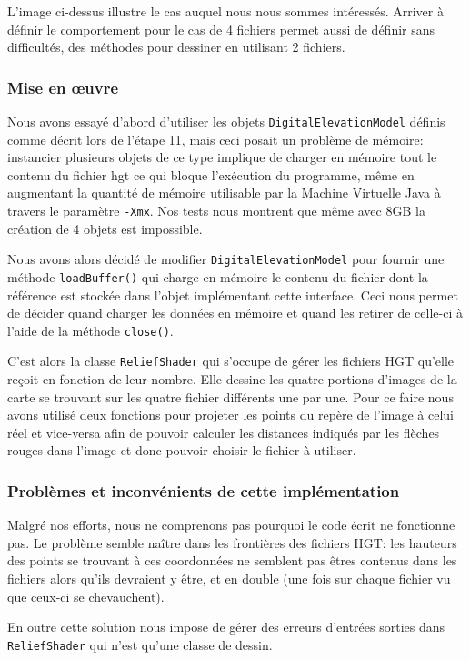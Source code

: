 \documentclass[11pt,a4paper]{article}
\begin{document}
L'image ci-dessus illustre le cas auquel nous nous sommes intéressés. Arriver à définir le comportement pour le cas de 4 fichiers permet aussi de définir sans difficultés, des méthodes pour dessiner en utilisant 2 fichiers.

\subsubsection*{Mise en œuvre}
Nous avons essayé d'abord d'utiliser les objets \texttt{DigitalElevationModel} définis comme décrit lors de l'étape 11, mais ceci posait un problème de mémoire: instancier plusieurs objets de ce type implique de charger en mémoire tout le contenu du fichier hgt ce qui bloque l'exécution du programme, même en augmentant la quantité de mémoire utilisable par la Machine Virtuelle Java à travers le paramètre \texttt{-Xmx}. Nos tests nous montrent que même avec 8GB la création de 4 objets est impossible.

Nous avons alors décidé de modifier \texttt{DigitalElevationModel} pour fournir une méthode \texttt{loadBuffer()} qui charge en mémoire le contenu du fichier dont la référence est stockée dans l'objet implémentant cette interface. Ceci nous permet de décider quand charger les données en mémoire et quand les retirer de celle-ci à l'aide de la méthode \texttt{close()}.

C'est alors la classe \texttt{ReliefShader} qui s'occupe de gérer les fichiers HGT qu'elle reçoit en fonction de leur nombre. Elle dessine les quatre portions d'images de la carte se trouvant sur les quatre fichier différents une par une. Pour ce faire nous avons utilisé deux fonctions pour projeter les points du repère de l'image à celui réel et vice-versa afin de pouvoir calculer les distances indiqués par les flèches rouges dans l'image et donc pouvoir choisir le fichier à utiliser.

\subsubsection*{Problèmes et inconvénients de cette implémentation}
Malgré nos efforts, nous ne comprenons pas pourquoi le code écrit ne fonctionne pas. Le problème semble naître dans les frontières des fichiers HGT: les hauteurs des points se trouvant à ces coordonnées ne semblent pas êtres contenus dans les fichiers alors qu'ils devraient y être, et en double (une fois sur chaque fichier vu que ceux-ci se chevauchent).

En outre cette solution nous impose de gérer des erreurs d'entrées sorties dans \texttt{ReliefShader} qui n'est qu'une classe de dessin.
\end{document}
